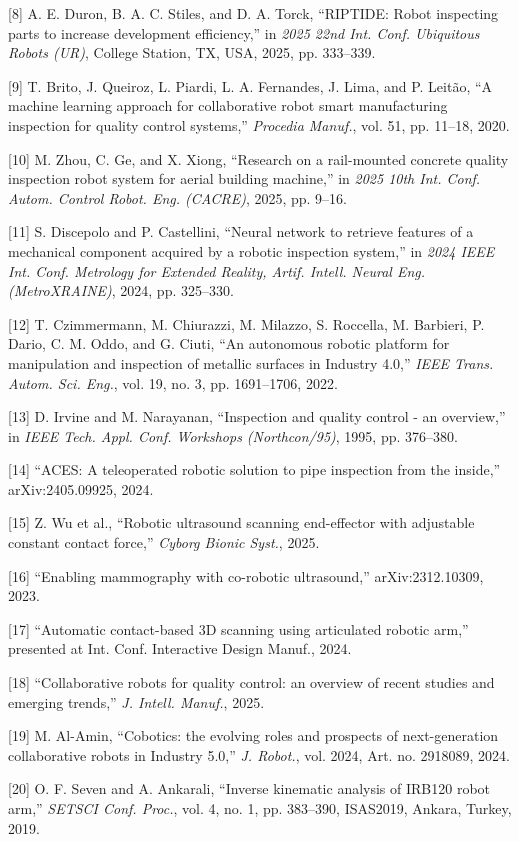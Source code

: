 \documentclass[conference]{IEEEtran}
\begin{document}
{[}8{]} A. E. Duron, B. A. C. Stiles, and D. A. Torck, ``RIPTIDE: Robot inspecting parts to increase development efficiency,'' in \textit{2025 22nd Int. Conf. Ubiquitous Robots (UR)}, College Station, TX, USA, 2025, pp. 333--339.

{[}9{]} T. Brito, J. Queiroz, L. Piardi, L. A. Fernandes, J. Lima, and P. Leit\~ao, ``A machine learning approach for collaborative robot smart manufacturing inspection for quality control systems,'' \textit{Procedia Manuf.}, vol. 51, pp. 11--18, 2020.

{[}10{]} M. Zhou, C. Ge, and X. Xiong, ``Research on a rail-mounted concrete quality inspection robot system for aerial building machine,'' in \textit{2025 10th Int. Conf. Autom. Control Robot. Eng. (CACRE)}, 2025, pp. 9--16.

{[}11{]} S. Discepolo and P. Castellini, ``Neural network to retrieve features of a mechanical component acquired by a robotic inspection system,'' in \textit{2024 IEEE Int. Conf. Metrology for Extended Reality, Artif. Intell. Neural Eng. (MetroXRAINE)}, 2024, pp. 325--330.

{[}12{]} T. Czimmermann, M. Chiurazzi, M. Milazzo, S. Roccella, M. Barbieri, P. Dario, C. M. Oddo, and G. Ciuti, ``An autonomous robotic platform for manipulation and inspection of metallic surfaces in Industry 4.0,'' \textit{IEEE Trans. Autom. Sci. Eng.}, vol. 19, no. 3, pp. 1691--1706, 2022.

{[}13{]} D. Irvine and M. Narayanan, ``Inspection and quality control - an overview,'' in \textit{IEEE Tech. Appl. Conf. Workshops (Northcon/95)}, 1995, pp. 376--380.

{[}14{]} ``ACES: A teleoperated robotic solution to pipe inspection from the inside,'' arXiv:2405.09925, 2024.

{[}15{]} Z. Wu et al., ``Robotic ultrasound scanning end-effector with adjustable constant contact force,'' \textit{Cyborg Bionic Syst.}, 2025.

{[}16{]} ``Enabling mammography with co-robotic ultrasound,'' arXiv:2312.10309, 2023.

{[}17{]} ``Automatic contact-based 3D scanning using articulated robotic arm,'' presented at Int. Conf. Interactive Design Manuf., 2024.

{[}18{]} ``Collaborative robots for quality control: an overview of recent studies and emerging trends,'' \textit{J. Intell. Manuf.}, 2025.

{[}19{]} M. Al-Amin, ``Cobotics: the evolving roles and prospects of next-generation collaborative robots in Industry 5.0,'' \textit{J. Robot.}, vol. 2024, Art. no. 2918089, 2024.

{[}20{]} O. F. Seven and A. Ankarali, ``Inverse kinematic analysis of IRB120 robot arm,'' \textit{SETSCI Conf. Proc.}, vol. 4, no. 1, pp. 383--390, ISAS2019, Ankara, Turkey, 2019.
\end{document}
